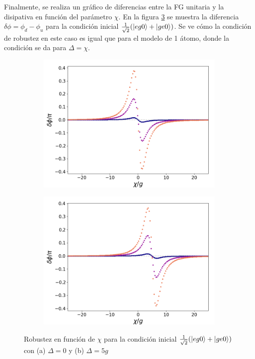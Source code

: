 Finalmente, se realiza un gráfico de diferencias entre la FG unitaria y la disipativa en función del parámetro $\chi$. En la figura \ref{fig5:robustez kerr eg0} se muestra la diferencia $\delta\phi=\phi_d-\phi_u$ para la condición inicial $\frac{1}{\sqrt{2}}(\ket{eg0}+\ket{ge0})$. Se ve cómo la condición de robustez en este caso es igual que para el modelo de 1 átomo, donde la condición se da para $\Delta=\chi$. 

\begin{figure}[h]
    \centering
    \begin{subfigure}{0.49\textwidth}
        \includegraphics[width=\textwidth]{figuras/ch5/robustez/chi/eg0+ge0 d=0.0g k=0.0g J=0.0g.png}
        \caption{}
        \label{fig5:robustez kerr 1 eg0}
    \end{subfigure}
    \hfill
    \begin{subfigure}{0.49\textwidth}
        \includegraphics[width=\textwidth]{figuras/ch5/robustez/chi/eg0+ge0 d=5.0g k=0.0g J=0.0g.png}
        \caption{}
        \label{fig5:robustez kerr 2 eg0}
    \end{subfigure}
    \caption{Robustez en función de $\chi$ para la condición inicial $\frac{1}{\sqrt{2}}(\ket{eg0}+\ket{ge0})$ con (a) $\Delta=0$ y (b) $\Delta=5g$}
    \label{fig5:robustez kerr eg0}
\end{figure}

